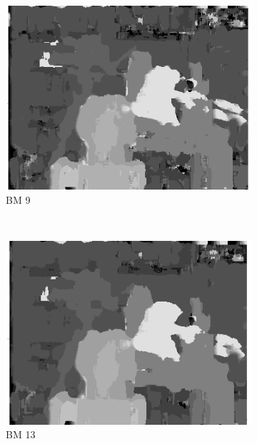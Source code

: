 \begin{figure}

  \begin{subfigure}[b]{0.23\textwidth}
    \centering
    \includegraphics[width=\textwidth]{images/stereo-pairs/tsukuba_bm_9.png}
    \caption{BM 9}
  \end{subfigure}
  ~
  \begin{subfigure}[b]{0.23\textwidth}
    \centering
    \includegraphics[width=\textwidth]{images/stereo-pairs/tsukuba_bm_13.png}
    \caption{BM 13}
  \end{subfigure}
  ~
  \begin{subfigure}[b]{0.23\textwidth}
    \centering

\end{subfigure}
\end{figure}
